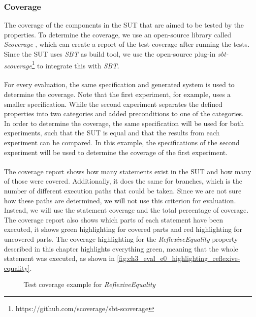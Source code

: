 \subsubsection{Coverage}
The coverage of the components in the SUT that are aimed to be tested by the properties. To determine the coverage, we use an open-source library called \textit{Scoverage} \cite{siteScoverage2017}, which can create a report of the test coverage after running the tests. Since the SUT uses \textit{SBT} as build tool, we use the open-source plug-in \textit{sbt-scoverage}\footnote{https://github.com/scoverage/sbt-scoverage} to integrate this with \textit{SBT}.\\
\\
For every evaluation, the same specification and generated system is used to determine the coverage. Note that the first experiment, for example, uses a smaller specification. While the second experiment separates the defined properties into two categories and added preconditions to one of the categories. In order to determine the coverage, the same specification will be used for both experiments, such that the SUT is equal and that the results from each experiment can be compared. In this example, the specifications of the second experiment will be used to determine the coverage of the first experiment.\\
\\
The coverage report shows how many statements exist in the SUT and how many of those were covered. Additionally, it does the same for branches, which is the number of different execution paths that could be taken. Since we are not sure how these paths are determined, we will not use this criterion for evaluation. Instead, we will use the statement coverage and the total percentage of coverage. The coverage report also shows which parts of each statement have been executed, it shows green highlighting for covered parts and red highlighting for uncovered parts. The coverage highlighting for the \textit{ReflexiveEquality} property described in this chapter highlights everything green, meaning that the whole statement was executed, as shown in \autoref{fig:ch3_eval_e0_highlighting_reflexive-equality}.
\FloatBarrier
\begin{figure}[!ht]
\caption{Test coverage example for \textit{ReflexiveEquality}}
\label{fig:ch3_eval_e0_highlighting_reflexive-equality}
\centering
\end{figure}
